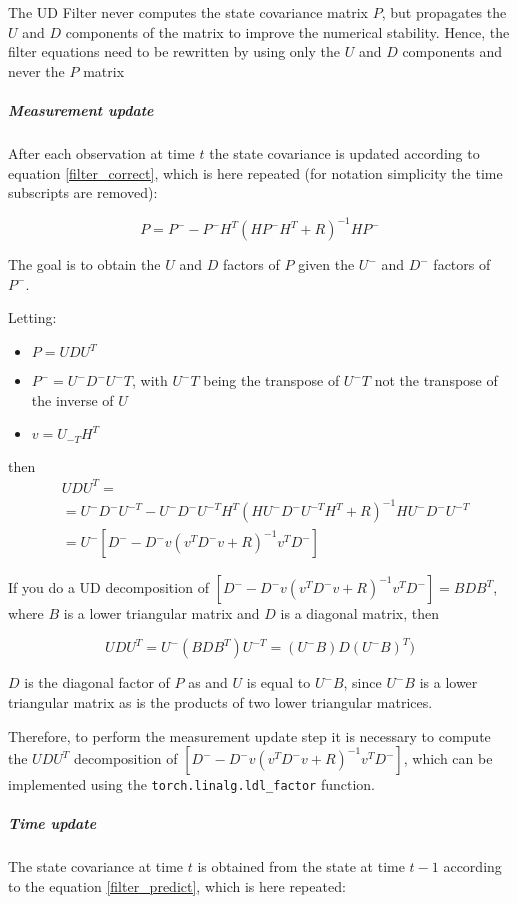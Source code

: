 \documentclass{article}
\begin{document}
The UD Filter never computes the state covariance matrix $P$, but propagates the $U$ and $D$ components of the matrix to improve the numerical stability. Hence, the filter equations need to be rewritten by using only the $U$ and $D$ components and never the $P$ matrix

\subparagraph{Measurement update}

After each observation at time $t$ the state covariance is updated according to equation \ref{filter_correct}, which is here repeated (for notation simplicity the time subscripts are removed):

$$ P = P^- - P^-H^T(HP^-H^T + R)^{-1}HP^-$$

The goal is to obtain the $U$ and $D$ factors of $P$ given the $U^-$ and $D^-$ factors of $P^-$.

Letting:
\begin{itemize}
    \item $P = UDU^T$
    \item $P^- = U^-D^-U^-T$, with $U^-T$ being the transpose of $U^-T$ not the transpose of the inverse of $U$
    \item $v = U_{-T}H^T$
\end{itemize}
then 
\begin{align}
    &UDU^T = \\
    &= U^-D^-U^{-T} - U^-D^-U^{-T}H^T\left(HU^-D^-U^{-T}H^T + R\right)^{-1}HU^-D^-U^{-T} \\
    &= U^-\left[D^- - D^-v(v^TD^-v+R)^{-1}v^TD^- \right]
\end{align}

If you do a UD decomposition of $\left[D^- - D^-v(v^TD^-v+R)^{-1}v^TD^- \right] = BDB^T$, where $B$ is a lower triangular matrix and $D$ is a diagonal matrix, then 

\[ UDU^T = U^-(BDB^T)U^{-T} = (U^-B)D(U^-B)^{T}) \]

$D$ is the diagonal factor of $P$ as and $U$ is equal to $U^-B$, since $U^-B$ is a lower triangular matrix as is the products of two lower triangular matrices.

Therefore, to perform the measurement update step it is necessary to compute the $UDU^T$ decomposition of $\left[D^- - D^-v(v^TD^-v+R)^{-1}v^TD^- \right]$, which can be implemented using the \verb|torch.linalg.ldl_factor| function.

\subparagraph{Time update}

The state covariance at time $t$ is obtained from the state at time $t-1$ according to the equation \ref{filter_predict}, which is here repeated:
\end{document}
